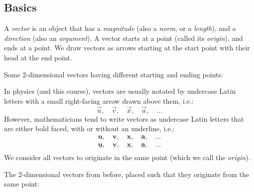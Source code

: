 \subsection{Basics}
A \emph{vector} is an object that has a \emph{magnitude} (also a \emph{norm}, or a \emph{length}), and a \emph{direction} (also an \emph{argument}). A vector starts at a point (called its \emph{origin}), and ends at a point. We draw vectors as arrows starting at the start point with their head at the end point.
\begin{example}
  Some 2-dimensional vectors having different starting and ending points:
  \begin{figure}[H]
  \centering
  \end{figure}
\end{example}
In physics (and this course), vectors are usually notated by undercase Latin letters with a small right-facing arrow drawn above them, i.e.:
\begin{equation*}
  \vec{u},\quad\vec{v},\quad\vec{x},\quad\vec{a},\quad\dots
\end{equation*}
However, mathematicians tend to write vectors as undercase Latin letters that are either bold faced, with or without an underline, i.e.:
\begin{align*}
  \bm{u},\quad\bm{v},\quad\bm{x},\quad\bm{a},\quad\dots\\
  \underline{\bm{u}},\quad\underline{\bm{v}},\quad\underline{\bm{x}},\quad\underline{\bm{a}},\quad\dots\\
\end{align*}
We consider all vectors to originate in the same point (which we call the \emph{origin}).
\begin{example}
  The 2-dimensional vectors from before, placed such that they originate from the same point:
  \begin{figure}[H] 
  \centering
  \end{figure}
\end{example}

